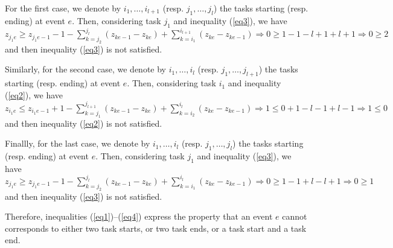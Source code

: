 \documentclass{report}
\begin{document}
For the first case, we denote by $i_1,\dots,i_{l+1}$
(resp. $j_1,\dots,j_l$) the tasks starting (resp. ending) at event
$e$. Then, considering task $j_1$ and inequality (\ref{eq3}), we have
$z_{j_1e} \ge z_{j_1e-1} -1 - \sum_{k=j_2}^{j_l}(z_{ke-1}-z_{ke})+
\sum_{k=i_1}^{i_{l+1}}(z_{ke}-z_{ke-1}) \Rightarrow 0 \ge
1-1-l+1+l+1\Rightarrow 0\ge 2$ and then inequality (\ref{eq3}) is not
satisfied.

Similarly, for the second case, we denote by $i_1,\dots,i_{l}$
(resp. $j_1,\dots,j_{l+1}$) the tasks starting (resp. ending) at event
$e$. Then, considering task $i_1$ and inequality (\ref{eq2}), we have
$z_{i_1e} \le z_{i_1e-1}+1 - \sum_{k=j_1}^{j_{l+1}}(z_{ke-1}-z_{ke})+
\sum_{k=i_2}^{i_{l}}(z_{ke}-z_{ke-1}) \Rightarrow 1 \le
0+1-l-1+l-1\Rightarrow 1\le 0$ and then inequality (\ref{eq2}) is not
satisfied.

Finallly, for the last case, we denote by $i_1,\dots,i_{l}$
(resp. $j_1,\dots,j_{l}$) the tasks starting (resp. ending) at event
$e$. Then, considering task $j_1$ and inequality (\ref{eq3}), we have
$z_{j_1e} \ge z_{j_1e-1} -1 - \sum_{k=j_2}^{j_{l}}(z_{ke-1}-z_{ke})+
\sum_{k=i_1}^{i_{l}}(z_{ke}-z_{ke-1}) \Rightarrow 0 \ge
1-1+l-l+1\Rightarrow 0\ge 1$ and then inequality (\ref{eq3}) is not
satisfied.

Therefore, inequalities (\ref{eq1})--(\ref{eq4}) express the property
that an event $e$ cannot corresponds to either two task starts, or two
task ends, or a task start and a task end.
\end{document}
